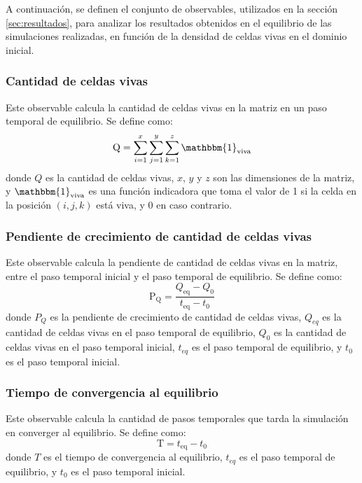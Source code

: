 A continuación, se definen el conjunto de observables, utilizados en la sección \ref{sec:resultados},
para analizar los resultados obtenidos en el equilibrio de las simulaciones realizadas, en función
de la densidad de celdas vivas en el dominio inicial.

\subsubsection{Cantidad de celdas vivas}\label{subsubsec:cantidad-de-celdas-vivas}
Este observable calcula la cantidad de celdas vivas en la matriz en un paso temporal de equilibrio.
Se define como:
\begin{equation}
    \text{Q} = \sum_{i=1}^{x} \sum_{j=1}^{y} \sum_{k=1}^{z} \mathbbm{1}_{\text{viva}}
    \label{eq:cantidad-celdas-vivas}
\end{equation}
donde $Q$ es la cantidad de celdas vivas, $x$, $y$ y $z$ son las dimensiones de la matriz, y $\mathbbm{1}_{\text{viva}}$
es una función indicadora que toma el valor de 1 si la celda en la posición $(i, j, k)$ está viva, y 0 en caso contrario.

\subsubsection{Pendiente de crecimiento de cantidad de celdas vivas}\label{subsubsec:pendiente-de-crecimiento-de-cantidad-de-celdas-vivas}
Este observable calcula la pendiente de cantidad de celdas vivas en la matriz, entre el paso temporal
inicial y el paso temporal de equilibrio.
Se define como:
\begin{equation}
    \text{P}_{\text{Q}} = \frac{Q_{\text{eq}} - Q_{0}}{t_{\text{eq}} - t_{0}}
    \label{eq:pendiente-crecimiento-celdas-vivas}
\end{equation}
donde $P_{Q}$ es la pendiente de crecimiento de cantidad de celdas vivas, $Q_{eq}$ es la
cantidad de celdas vivas en el paso temporal de equilibrio, $Q_{0}$ es la cantidad de celdas
vivas en el paso temporal inicial, $t_{eq}$ es el paso temporal de equilibrio, y $t_{0}$ es el paso temporal inicial.

\subsubsection{Tiempo de convergencia al equilibrio}\label{subsubsec:tiempo-de-convergencia-al-equilibrio}
Este observable calcula la cantidad de pasos temporales que tarda la simulación en converger al equilibrio.
Se define como:
\begin{equation}
    \text{T} = t_{\text{eq}} - t_{0}
    \label{eq:tiempo-convergencia-equilibrio}
\end{equation}
donde $T$ es el tiempo de convergencia al equilibrio, $t_{eq}$ es el paso temporal de equilibrio,
y $t_{0}$ es el paso temporal inicial.


